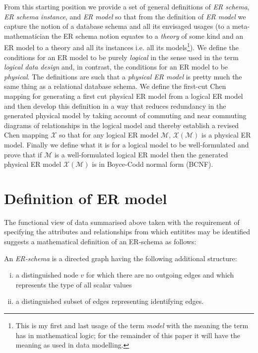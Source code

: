 \documentclass[10pt,a4paper]{article}
\newcommand{\term}[1]{\textit{{#1}}}
\newcommand{\genericmodel}{\mathcal{M}}
\newcommand{\logtophys}{\mathcal{X}}
\newcommand{\Vtype}{v}
\begin{document}
\noindent
From this starting position we provide a set of general definitions of \term{ER schema}, \term{ER schema instance},
and \term{ER model} so that from the definition of \term{ER model} we capture the notion of a database schema 
and all its envisaged usages (to a meta-mathematician the ER schema notion equates to a \term{theory} of some kind
and an ER model to a theory and all its instances i.e. all its models\footnote{This is my first and last usage of the term \term{model} 
with the meaning the term has in mathematical logic; for the remainder of this paper it will have the meaning as used in data modelling.}).  We define the conditions  for an ER model to be purely \term{logical} in the sense used in
the term \term{logical data design} and, in contrast, the conditions for an ER model to be \term{physical}. The definitions are such that
a \term{physical ER model} is pretty much the same thing as a  relational database schema. We define the first-cut Chen mapping for generating a first 
cut physical ER model from a logical ER model and then develop this definition in a way that reduces redundancy in the generated physical model by taking account of commuting and near commuting diagrams of relationships in the logical model
and thereby establish a revised Chen mapping $\logtophys$ so that for any logical ER model $\genericmodel$, $\logtophys(\genericmodel)$ is a physical ER model. Finally we define what it is for a logical model to be well-formulated and prove that if $\genericmodel$ is a well-formulated logical ER model then 
the generated physical ER model $\logtophys(\genericmodel)$ is in Boyce-Codd normal form (BCNF).   


\section{Definition of ER model}
The functional view of data summarised above taken with the requirement of specifying the attributes and relationships from which entitites may be identified suggests a mathematical definition of an ER-schema  as  follows:

\begin{definition}
An \term{ER-schema} is a directed graph having the following additional structure:

\begin{enumerate} [(i)]
\item{a distinguished node $\Vtype$ for which there are no outgoing edges and which represents the type of all scalar values }

\item{a distinguished subset  of edges representing identifying edges.  
}
\end{enumerate}
\end{definition}
\end{document}
